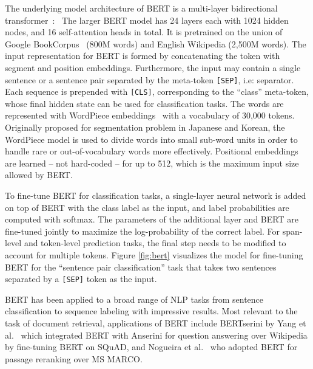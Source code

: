 The underlying model architecture of BERT is a multi-layer bidirectional transformer~\cite{vaswani2017attention}:\
The larger BERT model has 24 layers each with 1024 hidden nodes, and 16 self-attention heads in total.
It is pretrained on the union of Google BookCorpus~\cite{zhu2015aligning} (800M words) and English Wikipedia (2,500M words).
The input representation for BERT is formed by concatenating the token with segment and position embeddings.
Furthermore, the input may contain a single sentence or a sentence pair separated by the meta-token \texttt{[SEP]}, i.e: separator.
Each sequence is prepended with \texttt{[CLS]}, corresponding to the ``class'' meta-token, whose final hidden state can be used for classification tasks.
The words are represented with WordPiece embeddings~\cite{wu2016google} with a vocabulary of 30,000 tokens.
Originally proposed for segmentation problem in Japanese and Korean, the WordPiece model is used to divide words into small sub-word units in order to handle rare or out-of-vocabulary words more effectively.
Positional embeddings are learned -- not hard-coded -- for up to 512, which is the maximum input size allowed by BERT.

To fine-tune BERT for classification tasks, a single-layer neural network is added on top of BERT with the class label as the input, and label probabilities are computed with softmax.
The parameters of the additional layer and BERT are fine-tuned jointly to maximize the log-probability of the correct label.
For span-level and token-level prediction tasks, the final step needs to be modified to account for multiple tokens.
Figure \ref{fig:bert} visualizes the model for fine-tuning BERT for the ``sentence pair classification'' task that takes two sentences separated by a \texttt{[SEP]} token as the input.

BERT has been applied to a broad range of NLP tasks from sentence classification to sequence labeling with impressive results.
Most relevant to the task of document retrieval, applications of BERT include BERTserini by Yang et al.~\cite{yang2019end} which integrated BERT with Anserini for question answering over Wikipedia by fine-tuning BERT on SQuAD, and Nogueira et al.~\cite{nogueira2019passage} who adopted BERT for passage reranking over MS MARCO.

